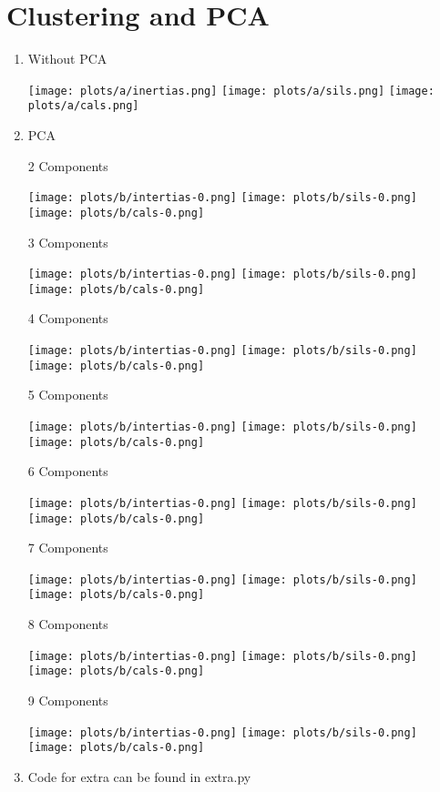 \documentclass[12pt,a4paper]{article}
\begin{document}
\section{Clustering and PCA}
\begin{enumerate}[label=(\alph*)]
	\item Without PCA
	
		\texttt{[image: plots/a/inertias.png]}
		\texttt{[image: plots/a/sils.png]}
		\texttt{[image: plots/a/cals.png]}
	\item PCA
	
	2 Components
		
		\texttt{[image: plots/b/intertias-0.png]}
		\texttt{[image: plots/b/sils-0.png]}
		\texttt{[image: plots/b/cals-0.png]}
		
	3 Components
	
		\texttt{[image: plots/b/intertias-0.png]}
		\texttt{[image: plots/b/sils-0.png]}
		\texttt{[image: plots/b/cals-0.png]}

	4 Components
	
		\texttt{[image: plots/b/intertias-0.png]}
		\texttt{[image: plots/b/sils-0.png]}
		\texttt{[image: plots/b/cals-0.png]}

	5 Components
	
		\texttt{[image: plots/b/intertias-0.png]}
		\texttt{[image: plots/b/sils-0.png]}
		\texttt{[image: plots/b/cals-0.png]}
	
	6 Components
	
		\texttt{[image: plots/b/intertias-0.png]}
		\texttt{[image: plots/b/sils-0.png]}
		\texttt{[image: plots/b/cals-0.png]}

	7 Components
	
		\texttt{[image: plots/b/intertias-0.png]}
		\texttt{[image: plots/b/sils-0.png]}
		\texttt{[image: plots/b/cals-0.png]}

	8 Components
	
		\texttt{[image: plots/b/intertias-0.png]}
		\texttt{[image: plots/b/sils-0.png]}
		\texttt{[image: plots/b/cals-0.png]}

	9 Components
	
		\texttt{[image: plots/b/intertias-0.png]}
		\texttt{[image: plots/b/sils-0.png]}
		\texttt{[image: plots/b/cals-0.png]}
		
	\item
	Code for extra can be found in extra.py

\end{enumerate}
\end{document}
